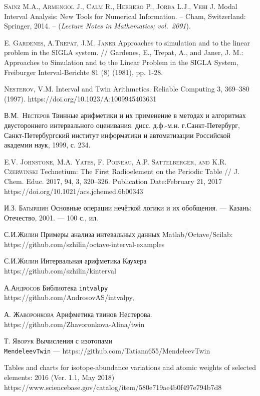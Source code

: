\documentclass[a5paper,openany]{book}
\begin{document}
\begin{thebibliography}{00}


\textsc{Sainz M.A., Armengol J., Calm R., Herrero P., Jorba L.J., Vehi J.}
Modal Interval Analysis: New Tools for Numerical Information. -- Cham, Switzerland: 
Springer, 2014. -- (\textsl{Lecture Notes in Mathematics; vol.~2091}). 


\textsc{E. Gardenes, A.Trepat, J.M. Janer}
Approaches to simulation and to the linear problem in the SIGLA system. //
Gardenes, E., Trepat, A., and Janer, J. M.: Approaches to Simulation and to the Linear Problem in the SIGLA System, Freiburger Interval-Berichte 81 (8) (1981), pp. 1-28.


\textsc{Nesterov, V.M.} Interval and Twin Arithmetics. Reliable Computing 3, 369–380 (1997). https://doi.org/10.1023/A:1009945403631

\textsc{В.М.~Нестеров} Твинные арифметики и их применение в методах и алгоритмах двустороннего интервального оценивания. дисс. д.ф.-м.н. г.Санкт-Петербург, Санкт-Петербургский институт информатики и автоматизации Российской академии наук, 1999, с. 234.

\textsc{E.V. Johnstone, M.A. Yates, F. Poineau, A.P. Sattelberger, and K.R. Czerwinski}
Technetium: The First Radioelement on the Periodic Table //
J. Chem. Educ. 2017, 94, 3, 320–326.
Publication Date:February 21, 2017
https://doi.org/10.1021/acs.jchemed.6b00343


\textsc{И.З. Батыршин} Основные операции нечёткой логики и их обобщения. --- Казань: Отечество, 2001. --- 100 с., ил.

\textsc{С.И.Жилин} Примеры анализа интевальных данных 
Matlab/Octave/Scilab:\\
https://github.com/szhilin/octave-interval-examples

\textsc{С.И.Жилин} Интервальная арифметика Каухера
https://github.com/szhilin/kinterval 

\textsc{А.Андросов } Библиотека {\tt intvalpy} \\
https://github.com/AndrosovAS/intvalpy, 

 \textsc{А. Жаворонкова} Арифметика твинов Нестерова. \\
https://github.com/Zhavoronkova-Alina/twin

\textsc{Т. Яворук}
Вычисления с изотопами\\
{\tt MendeleevTwin} ---  https://github.com/Tatiana655/MendeleevTwin	

Tables and charts for isotope-abundance variations and atomic weights of selected elements: 2016 (Ver. 1.1, May 2018)	\\
https://www.sciencebase.gov/catalog/item/580e719ae4b0f497e794b7d8



	
\end{thebibliography} 
\end{document}
